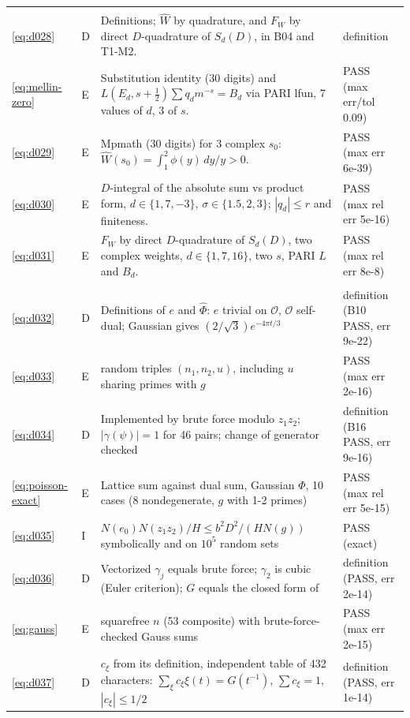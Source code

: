 \documentclass[11pt]{article}
\numberwithin{equation}{section}
\begin{document}
\begin{longtable}{@{}>{\raggedright\arraybackslash}p{1.2cm}>{\centering\arraybackslash}p{0.7cm}>{\raggedright\arraybackslash}p{9.05cm}>{\raggedright\arraybackslash}p{4.3cm}@{}}
\multicolumn{4}{@{}l}{\emph{Section~6}}\\
\eqref{eq:d028} & D & Definitions; $\widehat W$ by quadrature, and $F_W$ by direct $D$-quadrature of $S_d(D)$, in B04 and T1-M2. & definition\\
\eqref{eq:mellin-zero} & E & Substitution identity (30 digits) and $L(E_d,s+\frac12)\sum q_dm^{-s}=B_d$ via PARI lfun, 7 values of $d$, 3 of $s$. & PASS (max err/tol 0.09)\\
\eqref{eq:d029} & E & Mpmath (30 digits) for 3 complex $s_0$: $\widehat W(s_0)=\int_1^2\phi(y)\,dy/y>0$. & PASS (max err 6e-39)\\
\eqref{eq:d030} & E & $D$-integral of the absolute sum vs product form, $d\in\{1,7,-3\}$, $\sigma\in\{1.5,2,3\}$; $|q_d|\le r$ and finiteness. & PASS (max rel err 5e-16)\\
\eqref{eq:d031} & E & $F_W$ by direct $D$-quadrature of $S_d(D)$, two complex weights, $d\in\{1,7,16\}$, two $s$, PARI $L$ and $B_d$. & PASS (max rel err 8e-8)\\
\multicolumn{4}{@{}l}{\emph{Section~7}}\\
\eqref{eq:d032} & D & Definitions of $e$ and $\widehat\Phi$: $e$ trivial on $\mathcal O$, $\mathcal O$ self-dual; Gaussian gives $(2/\sqrt3)e^{-4\pi t/3}$ & definition (B10 PASS, err 9e-22)\\
\eqref{eq:d033} & E & 1200 random triples $(n_1,n_2,u)$, including $u$ sharing primes with $g$ & PASS (max err 2e-16)\\
\eqref{eq:d034} & D & Implemented by brute force modulo $z_1z_2$; $|\gamma(\psi)|=1$ for 46 pairs; change of generator checked & definition (B16 PASS, err 9e-16)\\
\eqref{eq:poisson-exact} & E & Lattice sum against dual sum, Gaussian $\Phi$, 10 cases (8 nondegenerate, $g$ with 1-2 primes) & PASS (max rel err 5e-15)\\
\eqref{eq:d035} & I & $N(e_0)N(z_1z_2)/H\le b^2D^2/(HN(g))$ symbolically and on $10^5$ random sets & PASS (exact)\\
\eqref{eq:d036} & D & Vectorized $\gamma_j$ equals brute force; $\gamma_2$ is cubic (Euler criterion); $G$ equals the closed form of~\cite{OAI1112} & definition (PASS, err 2e-14)\\
\eqref{eq:gauss} & E & 150 squarefree $n$ (53 composite) with brute-force-checked Gauss sums & PASS (max err 2e-15)\\
\eqref{eq:d037} & D & $c_\xi$ from its definition, independent table of 432 characters: $\sum_\xi c_\xi\xi(t)=G(t^{-1})$, $\sum c_\xi=1$, $|c_\xi|\le1/2$ & definition (PASS, err 1e-14)\\

\end{longtable}
\end{document}
